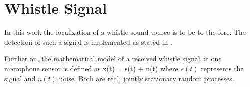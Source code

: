 \section{Whistle Signal}
\label{sec:02_whistleSignal}

In this work the localization of a whistle sound source is to be to the fore.
The detection of such a signal is implemented as stated in \cite{Hasselbring}.\\

Further on, the mathematical model of a received whistle signal at one microphone sensor
is defined as
\be
x(t) = s(t) + n(t)
\label{eq:02_whistleSignal}
\ee
where $s(t)$ represents the signal and $n(t)$ noise.
Both are real, jointly stationary random processes.